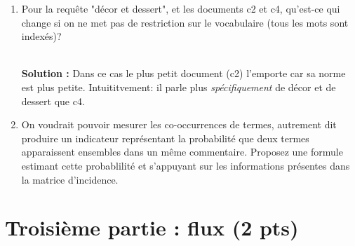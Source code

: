 \documentclass[11pt,a4paper]{article}
\newenvironment{solution}[0]{
~\\ \color{red} \textbf{Solution : }\color{black}}{%
}
\begin{document}
\begin{enumerate}
Expliquez brièvement la raison  du classement pour le premier document.

\begin{solution}
Les cosinus (requête non normalisée).

\begin{itemize}
  \item plat\,: c1 : $\frac{1}{\sqrt{2}}$;  
       c4 : $\frac{1}{\sqrt{3}}$; 
       c5 : $\frac{2}{\sqrt{6}}$; 
  
  \item décor et dessert\,: 
  
    c2 : $\frac{1+1}{\sqrt{3}}$; 
    c4 :  $\frac{1+1}{\sqrt{3}}$  
    c5 : $\frac{1}{\sqrt{6}}$; 

  \item vin et plat
  
    c1 : $\frac{1+1}{\sqrt{2}}$; 
    c2 : $\frac{1}{\sqrt{3}}$;
    c3 :  $\frac{2}{\sqrt{3}}$  
    c4 :  $\frac{1}{\sqrt{3}}$  
    c5 : $\frac{1+2}{\sqrt{6}}$; 
    
 \end{itemize}

\end{solution}  

   \item Pour la requête "décor et dessert", et les documents c2 et c4,
   qu'est-ce qui change si on ne met pas de restriction 
   sur le vocabulaire (tous les mots sont indexés)?
   
\begin{solution}
Dans ce cas le plus petit document (c2) l'emporte car sa norme est
plus petite. Intuititvement: il parle plus \emph{spécifiquement} de
décor et de dessert que c4.
\end{solution}   
    
\item On voudrait pouvoir mesurer les co-occurrences de termes, autrement dit
    produire un indicateur représentant la probabilité que deux termes
    apparaissent ensembles dans un même commentaire. Proposez une formule estimant
    cette probablilité et s'appuyant
      sur les informations présentes dans la matrice d'incidence.

\end{enumerate}


\section*{Troisième partie : flux (2 pts)}
\end{document}
